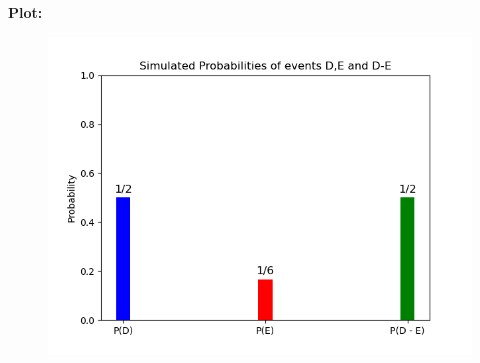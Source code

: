 \documentclass[journal]{IEEEtran}
\begin{document}
\newpage
\textbf{Plot:}\\
\begin{figure}[ht]
   \centering
   \includegraphics[width=\columnwidth]{figs/fig.png}
\end{figure}
\end{document}
